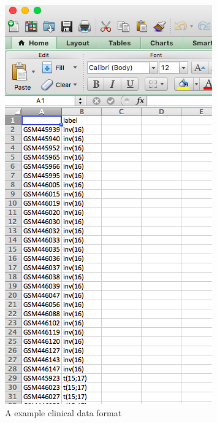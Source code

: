 \begin{figure}[H]
\begin{center}
\includegraphics[scale=0.5]{./figure/dataPreparation/clinicalData}
\caption{A example clinical data format}
\label{fig:clinical}
\end{center}
\end{figure}
